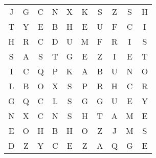 \documentclass{standalone}
\begin{document}
\begin{center}
\renewcommand{\arraystretch}{1.5}{
\noindent\begin{tabular}{cccccccccc}J & G & C & N & X & K & S & Z & S & H \\ 
T & Y & E & B & H & E & U & F & C & I \\ 
H & R & C & D & U & M & F & R & I & S \\ 
S & A & S & T & G & E & Z & I & E & T \\ 
I & C & Q & P & K & A & B & U & N & O \\ 
L & B & O & X & S & P & R & H & C & R \\ 
G & Q & C & L & S & G & G & U & E & Y \\ 
N & X & C & N & S & H & T & A & M & E \\ 
E & O & H & B & H & O & Z & J & M & S \\ 
D & Z & Y & C & E & Z & A & Q & G & E
\end{tabular}
}
\end{center}
\end{document}
